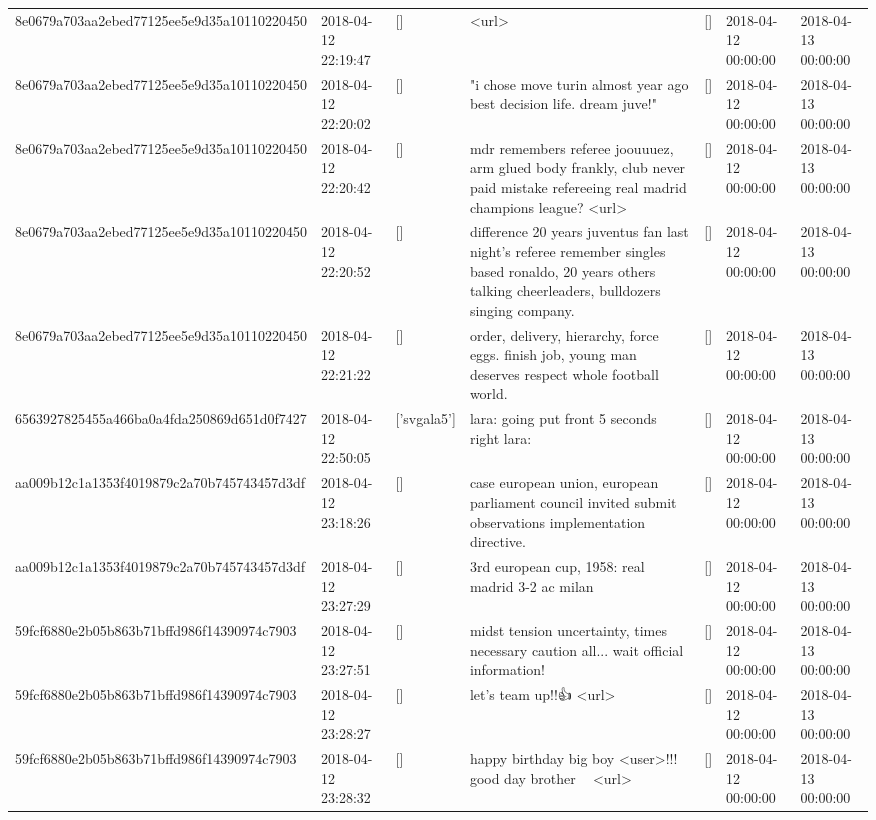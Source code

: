 \begin{tabular}{lllllll}
8e0679a703aa2ebed77125ee5e9d35a10110220450 & 2018-04-12 22:19:47 & [] & <url> & [] & 2018-04-12 00:00:00 & 2018-04-13 00:00:00 \\
8e0679a703aa2ebed77125ee5e9d35a10110220450 & 2018-04-12 22:20:02 & [] & "i chose move turin almost year ago best decision life. dream juve!" & [] & 2018-04-12 00:00:00 & 2018-04-13 00:00:00 \\
8e0679a703aa2ebed77125ee5e9d35a10110220450 & 2018-04-12 22:20:42 & [] & mdr remembers referee joouuuez, arm glued body frankly, club never paid mistake refereeing real madrid champions league? <url> & [] & 2018-04-12 00:00:00 & 2018-04-13 00:00:00 \\
8e0679a703aa2ebed77125ee5e9d35a10110220450 & 2018-04-12 22:20:52 & [] & difference 20 years juventus fan last night's referee remember singles based ronaldo, 20 years others talking cheerleaders, bulldozers singing company. & [] & 2018-04-12 00:00:00 & 2018-04-13 00:00:00 \\
8e0679a703aa2ebed77125ee5e9d35a10110220450 & 2018-04-12 22:21:22 & [] & order, delivery, hierarchy, force eggs. finish job, young man deserves respect whole football world. & [] & 2018-04-12 00:00:00 & 2018-04-13 00:00:00 \\
6563927825455a466ba0a4fda250869d651d0f7427 & 2018-04-12 22:50:05 & ['svgala5'] & lara: going put front 5 seconds right lara: & [] & 2018-04-12 00:00:00 & 2018-04-13 00:00:00 \\
aa009b12c1a1353f4019879c2a70b745743457d3df & 2018-04-12 23:18:26 & [] & case european union, european parliament council invited submit observations implementation directive. & [] & 2018-04-12 00:00:00 & 2018-04-13 00:00:00 \\
aa009b12c1a1353f4019879c2a70b745743457d3df & 2018-04-12 23:27:29 & [] & 3rd european cup, 1958: real madrid 3-2 ac milan & [] & 2018-04-12 00:00:00 & 2018-04-13 00:00:00 \\
59fcf6880e2b05b863b71bffd986f14390974c7903 & 2018-04-12 23:27:51 & [] & midst tension uncertainty, times necessary caution all... wait official information! & [] & 2018-04-12 00:00:00 & 2018-04-13 00:00:00 \\
59fcf6880e2b05b863b71bffd986f14390974c7903 & 2018-04-12 23:28:27 & [] & let's team up!!👍 <url> & [] & 2018-04-12 00:00:00 & 2018-04-13 00:00:00 \\
59fcf6880e2b05b863b71bffd986f14390974c7903 & 2018-04-12 23:28:32 & [] & happy birthday big boy <user>!!! good day brother 👏💪 <url> & [] & 2018-04-12 00:00:00 & 2018-04-13 00:00:00 \\

\end{tabular}
